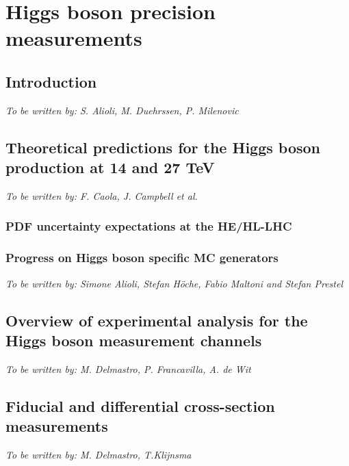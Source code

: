 \documentclass[../report.tex]{subfiles}
\providecommand{\main}{..}
\begin{document}
\section{Higgs boson precision measurements}

\subsection{Introduction}
\begin{center}{\it To be written by: S. Alioli, M. Duehrssen, P. Milenovic} \end{center}
\label{sec:2:introduction}


\subsection{Theoretical predictions for the Higgs boson production at 14 and 27 TeV}
\begin{center}{\it To be written by: F. Caola, J. Campbell et al.} \end{center}
\label{sec:2_HXSWG1}


\subsubsection{PDF uncertainty expectations at the HE/HL-LHC}


\subsubsection{Progress on Higgs boson specific MC generators}
\begin{center} {\it To be written by: Simone Alioli, Stefan H\"oche, Fabio Maltoni and Stefan Prestel} \end{center}


\subsection{Overview of experimental analysis for the Higgs boson measurement channels}
\begin{center}{\it To be written by: M. Delmastro, P. Francavilla, A. de Wit} \end{center}
\label{sec:2:channels}


\subsection{Fiducial and differential cross-section measurements}
\begin{center}{\it To be written by: M. Delmastro, T.Klijnsma} \end{center}
\label{sec:2:fiducial}

\end{document}
